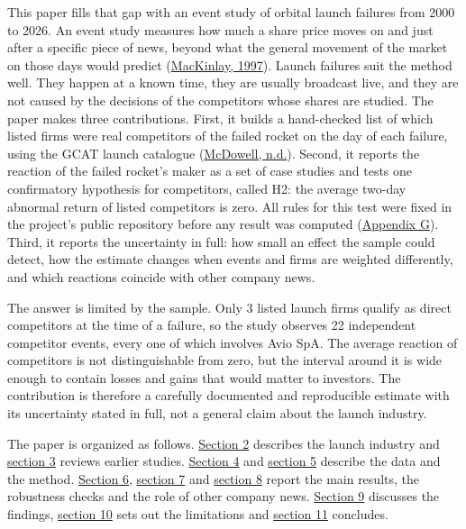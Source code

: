 \documentclass[12pt,a4paper]{article}
\begin{document}
This paper fills that gap with an event study of orbital launch failures from 2000 to 2026. An event study measures how much a share price moves on and just after a specific piece of news, beyond what the general movement of the market on those days would predict (\hyperlink{ref-mackinlay1997}{MacKinlay, 1997}). Launch failures suit the method well. They happen at a known time, they are usually broadcast live, and they are not caused by the decisions of the competitors whose shares are studied. The paper makes three contributions. First, it builds a hand-checked list of which listed firms were real competitors of the failed rocket on the day of each failure, using the GCAT launch catalogue (\hyperlink{ref-mcdowell}{McDowell, n.d.}). Second, it reports the reaction of the failed rocket's maker as a set of case studies and tests one confirmatory hypothesis for competitors, called H2: the average two-day abnormal return of listed competitors is zero. All rules for this test were fixed in the project's public repository before any result was computed (\hyperlink{apx-g}{Appendix G}). Third, it reports the uncertainty in full: how small an effect the sample could detect, how the estimate changes when events and firms are weighted differently, and which reactions coincide with other company news.

The answer is limited by the sample. Only 3 listed launch firms qualify as direct competitors at the time of a failure, so the study observes 22 independent competitor events, every one of which involves Avio SpA. The average reaction of competitors is not distinguishable from zero, but the interval around it is wide enough to contain losses and gains that would matter to investors. The contribution is therefore a carefully documented and reproducible estimate with its uncertainty stated in full, not a general claim about the launch industry.

The paper is organized as follows. \hyperlink{s2}{Section 2} describes the launch industry and \hyperlink{s3}{section 3} reviews earlier studies. \hyperlink{s4}{Section 4} and \hyperlink{s5}{section 5} describe the data and the method. \hyperlink{s6}{Section 6}, \hyperlink{s7}{section 7} and \hyperlink{s8}{section 8} report the main results, the robustness checks and the role of other company news. \hyperlink{s9}{Section 9} discusses the findings, \hyperlink{s10}{section 10} sets out the limitations and \hyperlink{s11}{section 11} concludes.
\end{document}
